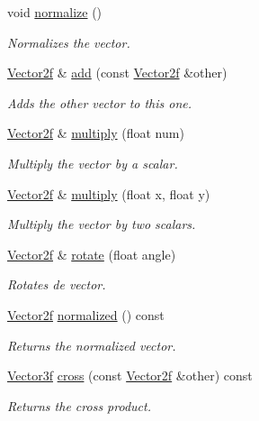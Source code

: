 \begin{DoxyCompactItemize}
\item 
void \hyperlink{classzt_1_1_vector2f_a2992fead31cd872fbb7d2bda8271cdad}{normalize} ()
\begin{DoxyCompactList}\small\item\em Normalizes the vector. \end{DoxyCompactList}\item 
\hyperlink{classzt_1_1_vector2f}{Vector2f} \& \hyperlink{classzt_1_1_vector2f_ac87f5252d360bf9bad0934acbaa4cc07}{add} (const \hyperlink{classzt_1_1_vector2f}{Vector2f} \&other)
\begin{DoxyCompactList}\small\item\em Adds the other vector to this one. \end{DoxyCompactList}\item 
\hyperlink{classzt_1_1_vector2f}{Vector2f} \& \hyperlink{classzt_1_1_vector2f_aada2302369ae96e18db8362768702bd0}{multiply} (float num)
\begin{DoxyCompactList}\small\item\em Multiply the vector by a scalar. \end{DoxyCompactList}\item 
\hyperlink{classzt_1_1_vector2f}{Vector2f} \& \hyperlink{classzt_1_1_vector2f_a72873ae6ba73ade6dcabe23f482b4f82}{multiply} (float x, float y)
\begin{DoxyCompactList}\small\item\em Multiply the vector by two scalars. \end{DoxyCompactList}\item 
\hyperlink{classzt_1_1_vector2f}{Vector2f} \& \hyperlink{classzt_1_1_vector2f_a97aab9087dc306b6a8b9c61fa84e98de}{rotate} (float angle)
\begin{DoxyCompactList}\small\item\em Rotates de vector. \end{DoxyCompactList}\item 
\hyperlink{classzt_1_1_vector2f}{Vector2f} \hyperlink{classzt_1_1_vector2f_a46f3e0b08f9ea3c9ec0f1c0670f82ebc}{normalized} () const
\begin{DoxyCompactList}\small\item\em Returns the normalized vector. \end{DoxyCompactList}\item 
\hyperlink{classzt_1_1_vector3f}{Vector3f} \hyperlink{classzt_1_1_vector2f_a51b847203bcda779189114905d1dc77d}{cross} (const \hyperlink{classzt_1_1_vector2f}{Vector2f} \&other) const
\begin{DoxyCompactList}\small\item\em Returns the cross product. \end{DoxyCompactList}\item 

\end{DoxyCompactItemize}
